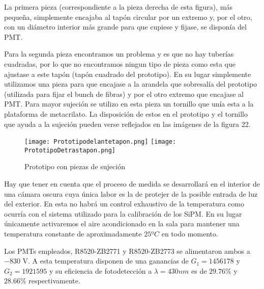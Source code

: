 La primera pieza (correspondiente a la pieza derecha de esta figura), más pequeña, simplemente encajaba al tapón circular por un extremo y, por el otro, con un diámetro interior más grande para que cupiese y fijase, se disponía del PMT.

Para la segunda pieza encontramos un problema y es que no hay tuberías cuadradas, por lo que no encontramos ningun tipo de pieza como esta que ajustase a este tapón (tapón cuadrado del prototipo). En su lugar simplemente utilizamos una pieza para que encajase a la arandela que sobresalía del prototipo (utilizada para fijar el bunch de fibras) y por el otro extremo que encajase al PMT. Para mayor sujeción se utilizo en esta pieza un tornillo que unía esta a la plataforma de metacrilato. La disposición de estos en el prototipo y el tornillo que ayuda a la sujeción pueden verse reflejados en las imágenes de la figura 22.

\begin{figure}[htb]
\centering
{
\texttt{[image: Prototipodelantetapon.png]} 
}
{
\texttt{[image: PrototipoDetrastapon.png]} 
}
\caption{Prototipo con piezas de sujeción \label{prototipotapones}}
\end{figure} 

Hay que tener en cuenta que el proceso de medida se desarrollará en el interior de una cámara oscura cuya única labor es la de protejer de la posible entrada de luz del exterior. En esta no habrá un control exhaustivo de la temperatura como ocurría con el sistema utilizado para la calibración de los SiPM. En su lugar únicamente activaremos el aire acondicionado en la sala para mantener una temperatura constante de aproximadamente $25ºC$ en todo momento.

Los PMTs empleados, R8520-ZB2771 y R8520-ZB2773 se alimentaron ambos a $-830$ V. A esta temperatura disponen de una ganancias de $G_1=1456178$ y $G_2=1921595$ y su eficiencia de fotodetección a $\lambda=430nm$ es de $29.76\%$ y $28.66\%$ respectivamente. 
